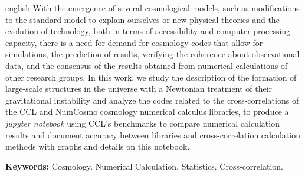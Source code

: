 \documentclass[12pt,a4paper,oneside,brazil]{abntex2}
\theoremstyle{definition}
\numberwithin{defin}{section}
\numberwithin{thm}{section}
\numberwithin{notation}{section}
\theoremstyle{remark}
\numberwithin{exmp}{section}
\numberwithin{p}{section}
\numberwithin{lema}{section}
\begin{document}
	\begin{resumo}[Abstract]
		
		\begin{otherlanguage*}{english}
			With the emergence of several cosmological models, such as modifications to the standard model to explain ourselves or new physical theories and the evolution of technology, both in terms of accessibility and computer processing capacity, there is a need for demand for cosmology codes that allow for simulations, the prediction of results, verifying the coherence about observational data, and the consensus of the results obtained from numerical calculations of other research groups. In this work, we study the description of the formation of large-scale structures in the universe with a Newtonian treatment of their gravitational instability and analyze the codes related to the cross-correlations of the CCL and NumCosmo cosmology numerical calculus libraries, to produce a \textit{jupyter notebook} using CCL's benchmarks to compare numerical calculation results and document accuracy between libraries and cross-correlation calculation methods with graphs and details on this notebook. 
			
			\textbf{Keywords:} Cosmology. Numerical Calculation. Statistics. Cross-correlation.
		\end{otherlanguage*}
		
	\end{resumo}
	
	
	\listoffigures*
	
	
	
	
	
	\cleardoublepage
	

	\tableofcontents*
	
	\cleardoublepage
	
	\textual
	\setcounter{page}{1}
	
	
	
	
	
		
	
	\postextual
	
	
	
\end{document}
